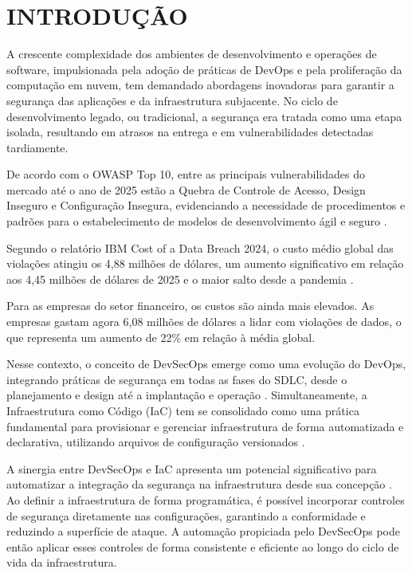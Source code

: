 \chapter{INTRODUÇÃO}
A crescente complexidade dos ambientes de desenvolvimento e operações de software, impulsionada pela adoção de práticas de DevOps e pela proliferação da computação em nuvem, tem demandado abordagens inovadoras para garantir a segurança das aplicações e da infraestrutura subjacente. No ciclo de desenvolvimento legado, ou tradicional, a segurança era tratada como uma etapa isolada, resultando em atrasos na entrega e em vulnerabilidades detectadas tardiamente.

De acordo com o OWASP Top 10, entre as principais vulnerabilidades do mercado até o ano de 2025 estão a Quebra de Controle de Acesso, Design Inseguro e Configuração Insegura, evidenciando a necessidade de procedimentos e padrões para o estabelecimento de modelos de desenvolvimento ágil e seguro .

Segundo o relatório IBM Cost of a Data Breach 2024, o custo médio global das violações atingiu os 4,88 milhões de dólares, um aumento significativo em relação aos 4,45 milhões de dólares de 2025 e o maior salto desde a pandemia .

Para as empresas do setor financeiro, os custos são ainda mais elevados. As empresas gastam agora 6,08 milhões de dólares a lidar com violações de dados, o que representa um aumento de 22\% em relação à média global.

Nesse contexto, o conceito de DevSecOps emerge como uma evolução do DevOps, integrando práticas de segurança em todas as fases do SDLC, desde o planejamento e design até a implantação e operação . Simultaneamente, a Infraestrutura como Código (IaC) tem se consolidado como uma prática fundamental para provisionar e gerenciar infraestrutura de forma automatizada e declarativa, utilizando arquivos de configuração versionados \cite{vehent2018securing}.

A sinergia entre DevSecOps e IaC apresenta um potencial significativo para automatizar a integração da segurança na infraestrutura desde sua concepção . Ao definir a infraestrutura de forma programática, é possível incorporar controles de segurança diretamente nas configurações, garantindo a conformidade e reduzindo a superfície de ataque. A automação propiciada pelo DevSecOps pode então aplicar esses controles de forma consistente e eficiente ao longo do ciclo de vida da infraestrutura.


